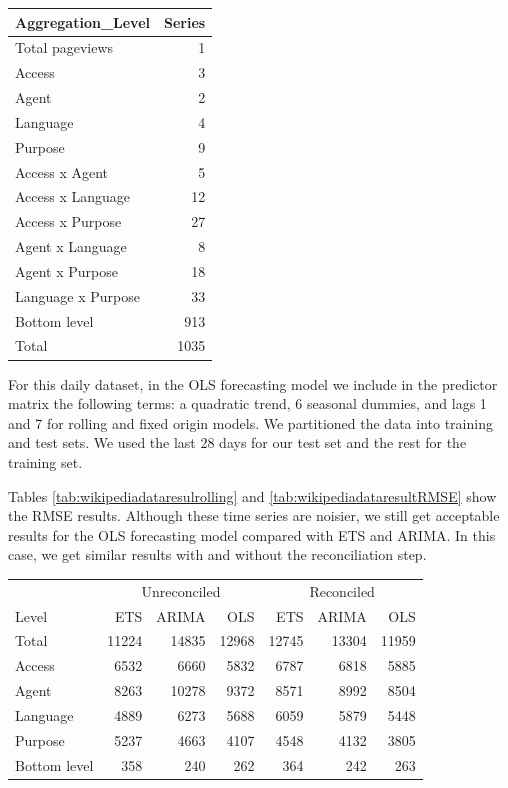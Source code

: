 \documentclass[11pt,a4paper,]{article}
\let\origtable\table
\let\endorigtable\endtable
\renewenvironment{table}[1][2] {
    \expandafter\origtable\expandafter[!htbp]
} {
    \endorigtable
}
\begin{document}
\begin{table}[!h]

\caption{\label{tab:wikidivision}Number of Wikipedia pageviews series at each aggregation level.}
\centering
\begin{tabular}[t]{lr}
\toprule
Aggregation\_Level & Series\\
\midrule
Total pageviews & 1\\
Access & 3\\
Agent & 2\\
Language & 4\\
Purpose & 9\\
Access x Agent & 5\\
Access x Language & 12\\
Access x Purpose & 27\\
Agent x Language & 8\\
Agent x Purpose & 18\\
Language x Purpose & 33\\
Bottom level & 913\\
\hline
Total & 1035\\
\bottomrule
\end{tabular}
\end{table}

For this daily dataset, in the OLS forecasting model we include in the predictor matrix the following terms: a quadratic trend, 6 seasonal dummies, and lags 1 and 7 for rolling and fixed origin models. We partitioned the data into training and test sets. We used the last 28 days for our test set and the rest for the training set.

Tables \ref{tab:wikipediadataresulrolling} and \ref{tab:wikipediadataresultRMSE} show the RMSE results. Although these time series are noisier, we still get acceptable results for the OLS forecasting model compared with ETS and ARIMA. In this case, we get similar results with and without the reconciliation step.

\begin{table}[!h]

\caption{\label{tab:wikipediadataresulrolling}Mean RMSE for ETS, ARIMA and OLS with and without reconciliation - Rolling origin - Wikipedia dataset}
\centering
\begin{tabular}[t]{lrrrrrr}
\toprule
\multicolumn{1}{c}{} & \multicolumn{3}{c}{Unreconciled} & \multicolumn{3}{c}{Reconciled} \\
\cmidrule(l{3pt}r{3pt}){2-4} \cmidrule(l{3pt}r{3pt}){5-7}
Level & ETS & ARIMA & OLS & ETS & ARIMA & OLS\\
\midrule
Total & 11224 & 14835 & 12968 & 12745 & 13304 & 11959\\
Access & 6532 & 6660 & 5832 & 6787 & 6818 & 5885\\
Agent & 8263 & 10278 & 9372 & 8571 & 8992 & 8504\\
Language & 4889 & 6273 & 5688 & 6059 & 5879 & 5448\\
Purpose & 5237 & 4663 & 4107 & 4548 & 4132 & 3805\\
Bottom level & 358 & 240 & 262 & 364 & 242 & 263\\
\bottomrule
\end{tabular}
\end{table}
\end{document}
